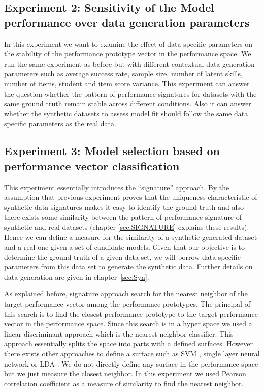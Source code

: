 
\subsection{Experiment 2: Sensitivity of the Model performance over data generation parameters}
\label{Sensitive}

In this experiment we want to examine the effect of data specific parameters on the stability of the performance prototype vector in the performance space. We run the same experiment as before but with different contextual data generation parameters such as average success rate, sample size, number of latent skills, number of items, student and item score variance. This experiment can answer the question whether the pattern of performance signatures for datasets with the same ground truth remain stable across different conditions. Also it can answer whether the synthetic datasets to assess model fit should follow the same data specific parameters as the real data.


\subsection{Experiment 3: Model selection based on performance vector classification}

This experiment essentially introduces the ``signature'' approach. By the assumption that previous experiment proves that the uniqueness characteristic of synthetic data signatures makes it easy to identify the ground truth and also there exists some similarity between the pattern of performance signature of synthetic and real datasets (chapter \ref{sec:SIGNATURE} explains these results). Hence we can define a measure for the similarity of a synthetic generated dataset and a real one given a set of candidate models. Given that our objective is to determine the ground truth of a given data set, we will borrow data specific parameters from this data set to generate the synthetic data.  Further details on data generation are given in chapter~\ref{sec:Syn}. 

As explained before, signature approach search for the nearest neighbor of the target performance vector among the performance prototypes. The principal of this search is to find the closest performance prototype to the target performance vector in the performance space. Since this search is in a hyper space we used a linear discriminant approach which is the nearest neighbor classifier. This approach essentially splits the space into parts with a defined surfaces. However there exists other approaches to define a surface such as SVM \citep{cortes1995support}, single layer neural network \citep{lippmann1987introduction} or LDA \citep{blei2003latent}. We do not directly define any surface in the performance space but we just measure the closest neighbor. In this experiment we used Pearson correlation coefficient as a measure of similarity to find the nearest neighbor.

